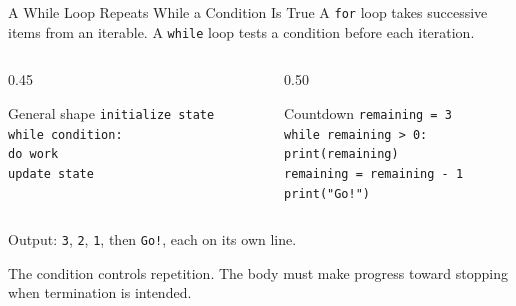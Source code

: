 \documentclass[aspectratio=169,10pt]{beamer}
\begin{document}
\begin{frame}[t]{A While Loop Repeats While a Condition Is True}
  \small
  A \texttt{for} loop takes successive items from an iterable. A \texttt{while} loop tests a condition before each iteration.
  \begin{columns}[T,onlytextwidth]
    \begin{column}{0.45\textwidth}
      \begin{block}{General shape}
        \texttt{initialize state}\\
        \texttt{while condition:}\\
        \hspace{0.18in}\texttt{do work}\\
        \hspace{0.18in}\texttt{update state}
      \end{block}
    \end{column}
    \begin{column}{0.50\textwidth}
      \begin{block}{Countdown}
        \texttt{remaining = 3}\\
        \texttt{while remaining > 0:}\\
        \hspace{0.18in}\texttt{print(remaining)}\\
        \hspace{0.18in}\texttt{remaining = remaining - 1}\\
        \texttt{print("Go!")}
      \end{block}
    \end{column}
  \end{columns}
  Output: \texttt{3}, \texttt{2}, \texttt{1}, then \texttt{Go!}, each on its own line.
  \begin{keyidea}
    The condition controls repetition. The body must make progress toward stopping when termination is intended.
  \end{keyidea}
\end{frame}
\end{document}
